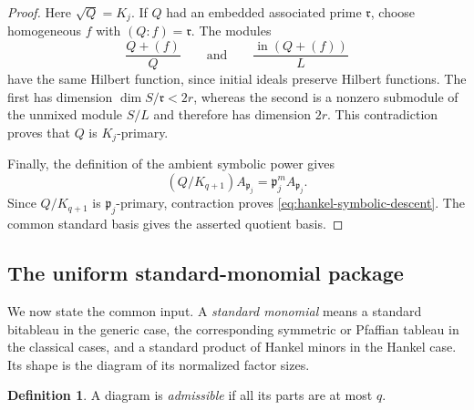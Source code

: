 \documentclass[11pt,reqno]{amsart}
\numberwithin{equation}{subsection}
\theoremstyle{definition}
\newtheorem{definition}[theorem]{Definition}
\theoremstyle{remark}
\newcommand{\fp}{\mathfrak p}
\begin{document}
\begin{proof}
Here $\sqrt Q=K_j$. If $Q$ had an embedded associated
prime $\mathfrak r$, choose homogeneous $f$ with
$(Q:f)=\mathfrak r$. The modules
\[
 \frac{Q+(f)}Q
 \qquad\text{and}\qquad
 \frac{\operatorname{in}(Q+(f))}{L}
\]
have the same Hilbert function, since initial ideals preserve
Hilbert functions. The first has dimension
$\dim S/\mathfrak r<2r$, whereas the second is a nonzero
submodule of the unmixed module $S/L$ and therefore has
dimension $2r$. This contradiction proves that $Q$ is
$K_j$-primary.

Finally, the definition of the ambient symbolic power gives
\[
 (Q/K_{q+1})A_{\fp_j}
 =\fp_j^mA_{\fp_j}.
\]
Since $Q/K_{q+1}$ is $\fp_j$-primary, contraction proves
\eqref{eq:hankel-symbolic-descent}. The common standard
basis gives the asserted quotient basis.
\end{proof}


\subsection{The uniform standard-monomial package}

We now state the common input.  A \emph{standard monomial} means a
standard bitableau in the generic case, the corresponding symmetric or
Pfaffian tableau in the classical cases, and a standard product of
Hankel minors in the Hankel case.  Its shape is the diagram of its normalized 
factor sizes.

\begin{definition}\label{def:admissible-shape}
A diagram is \emph{admissible} if all its parts are at most $q$. 
\end{definition}
\end{document}
